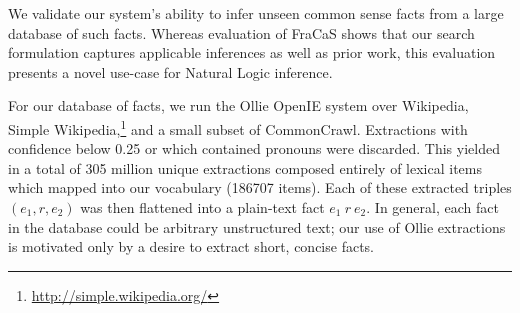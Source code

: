 %

%
%

\begin{table}
\begin{center}
  \caption{
    Accuracy inferring common-sense facts on a balanced test set.
    Lookup queries the lemmatized lower-case fact directly in the
      300M fact database.
    NaturalLI Only disallows such lookups, and infers every query from
      only unseen facts.
    NaturalLI + Lookup takes the union of the two systems.
    \label{tab:conceptnet}
  }
\end{center}
\end{table}

We validate our system's ability to infer unseen common sense facts
  from a large database of such facts.
Whereas evaluation of FraCaS shows that our search formulation captures
  applicable inferences as well as prior work, this evaluation presents
  a novel use-case for Natural Logic inference.

For our database of facts, we run the Ollie OpenIE system
  \cite{key:2012mausam-ollie} over Wikipedia, Simple Wikipedia,\footnote{
    \url{http://simple.wikipedia.org/}
  }
  and a small subset of CommonCrawl.
Extractions with confidence below 0.25 or which contained
  pronouns were discarded.
This yielded in a total of 305 million unique extractions composed
  entirely of lexical items which mapped into our vocabulary
  (\num{186707} items).
Each of these extracted triples $(e_1,r,e_2)$ was then flattened into
  a plain-text fact $e_1~r~e_2$.
In general, each fact in the database could be arbitrary unstructured
  text; our use of Ollie extractions is motivated only by a desire to
  extract short, concise facts.


